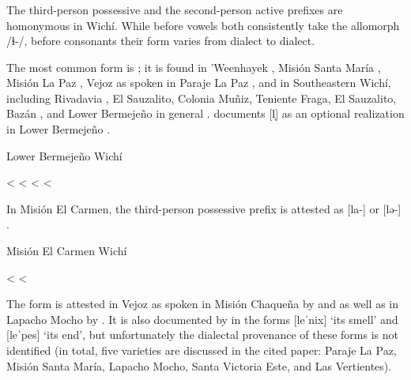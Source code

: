 \subsubsection{} \label{wi-syll-lh}

The third-person possessive and the second-person active prefixes are homonymous in Wichí. While before vowels both consistently take the allomorph /ɬ\mbox{-}/, before consonants their form varies from dialect to dialect.

The most common form is ; it is found in ’Weenhayek \citep[215]{KC16}, Misión Santa María \citep{SS07}, Misión La Paz \citep[87, 93, 95]{MA08}, Vejoz as spoken in Paraje La Paz \citep{AFG067}, and in Southeastern Wichí, including Rivadavia \citep[67, 100]{JT09-th}, El Sauzalito, Colonia Muñiz, Teniente Fraga, El Sauzalito,  Bazán \citep[48–49]{JB09}, and Lower Bermejeño in general \citep[163, 223]{VN14}. \citet[53, 120]{VN14} documents [l̩] as an optional realization in Lower Bermejeño .

\ea
Lower Bermejeño Wichí \citep[53, 120]{VN14} \label{wi-lh-lal-lb}\\
    \begin{xlist}
        \ex {} \recind {} < 
        \ex {} \recind {} < 
        \ex {} \recind {} < 
        \ex {} \recind {} < 
    \end{xlist}
\z

In Misión El Carmen, the third-person possessive prefix is attested as [la\mbox{-}] or [lə\mbox{-}] .

\ea
Misión El Carmen Wichí \citep[127, 130]{MC09} \label{wi-lh-lal-mec}\\
    \begin{xlist}
        \ex {} \recind {} < 
        \ex {} < 
    \end{xlist}
\z
{}

The form  is attested in Vejoz as spoken in Misión Chaqueña by \citet[131]{VU74} and \citet[29]{MG-MELO15} as well as in Lapacho Mocho by \citep[164]{AFG-SS-09}. It is also documented by \citet[150–151]{AFG-SS-09} in the forms [leˈnix] ‘its smell’ and [leˈpes] ‘its end’, but unfortunately the dialectal provenance of these forms is not identified (in total, five varieties are discussed in the cited paper: Paraje La Paz, Misión Santa María, Lapacho Mocho, Santa Victoria Este, and Las Vertientes).

